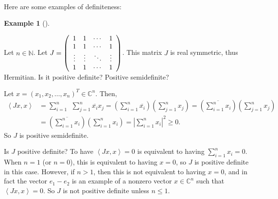 \documentclass[numbers=enddot,12pt,final,onecolumn,notitlepage]{scrartcl}%
\numberwithin{exer}{subsection}
\theoremstyle{definition}
\newtheorem{exam}[theo]{Example}
\newenvironment{example}[1][]
{\begin{exam}[#1]\begin{leftbar}}
{\end{leftbar}\end{exam}}
\let\sumnonlimits\sum
\renewcommand{\sum}{\sumnonlimits\limits}
\begin{document}
Here are some examples of definiteness:

\begin{example}
Let $n\in\mathbb{N}$. Let $J=\left(
\begin{array}
[c]{cccc}%
1 & 1 & \cdots & 1\\
1 & 1 & \cdots & 1\\
\vdots & \vdots & \ddots & \vdots\\
1 & 1 & \cdots & 1
\end{array}
\right)  $. This matrix $J$ is real symmetric, thus Hermitian. Is it positive
definite? Positive semidefinite?

Let $x=\left(  x_{1},x_{2},\ldots,x_{n}\right)  ^{T}\in\mathbb{C}^{n}$. Then,%
\begin{align*}
\left\langle Jx,x\right\rangle  & =\sum_{i=1}^{n}\ \ \sum_{j=1}^{n}%
\overline{x_{i}}x_{j}=\left(  \sum_{i=1}^{n}\overline{x_{i}}\right)  \left(
\sum_{j=1}^{n}x_{j}\right)  =\left(  \overline{\sum_{i=1}^{n}x_{i}}\right)
\left(  \sum_{j=1}^{n}x_{j}\right)  \\
& =\left(  \overline{\sum_{i=1}^{n}x_{i}}\right)  \left(  \sum_{i=1}^{n}%
x_{i}\right)  =\left\vert \sum_{i=1}^{n}x_{i}\right\vert ^{2}\geq0.
\end{align*}
So $J$ is positive semidefinite.

Is $J$ positive definite? To have $\left\langle Jx,x\right\rangle =0$ is
equivalent to having $\sum_{i=1}^{n}x_{i}=0$. When $n=1$ (or $n=0$), this is
equivalent to having $x=0$, so $J$ is positive definite in this case. However,
if $n>1$, then this is not equivalent to having $x=0$, and in fact the vector
$e_{1}-e_{2}$ is an example of a nonzero vector $x\in\mathbb{C}^{n}$ such that
$\left\langle Jx,x\right\rangle =0$. So $J$ is not positive definite unless
$n\leq1$.
\end{example}
\end{document}
